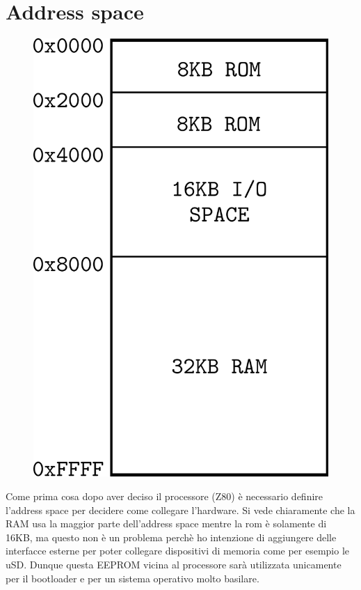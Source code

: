 \documentclass[final, ms, a4paper, 11pt]{memoir}
\newcommand\ddate{01.01.1970}
\begin{document}
\renewcommand\ddate{13.02.2017}
\section{Address space}
\begin{figure} \centering
    \includegraphics[width=.9\linewidth]{res/addrspace.pdf}
\end{figure}
Come prima cosa dopo aver deciso il processore (Z80) \`e necessario definire
l'address space per decidere come collegare l'hardware. Si vede chiaramente che
la RAM usa la maggior parte dell'address space mentre la rom \`e solamente di
16KB, ma questo non \`e un problema perch\`e ho intenzione di aggiungere delle
interfacce esterne per poter collegare dispositivi di memoria come per esempio
le uSD. Dunque questa EEPROM vicina al processore sar\`a utilizzata unicamente
per il bootloader e per un sistema operativo molto basilare.

\end{document}
